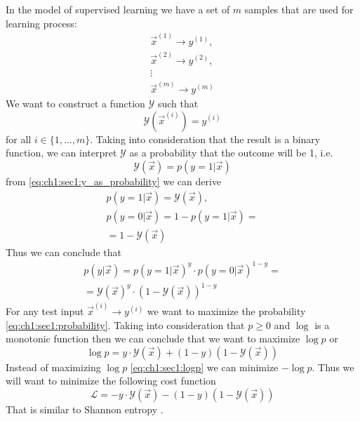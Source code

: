 In the model of supervised learning we have a set of $m$ samples that are used
for learning process:
\[
\begin{array}{c}
  \vec{x}^{(1)} \rightarrow y^{(1)}, \\
  \vec{x}^{(2)} \rightarrow y^{(2)}, \\
  \vdots \\
  \vec{x}^{(m)} \rightarrow y^{(m)}
\end{array}
\]
We want to construct a function $\mathcal{Y}$ such that
\[
\mathcal{Y}\left(\vec{x}^{(i)}\right) = y^{(i)}
\]
for all $i \in \{1, \dots, m\}$. Taking into consideration that the result is a
binary function, we can interpret $\mathcal{Y}$ as a probability that the
outcome will be 1, i.e.
\begin{equation}
  \mathcal{Y}\left(\vec{x}\right) = p\left(\left. y = 1\right|\vec{x}\right)
  \label{eq:ch1:sec1:y_as_probability}
\end{equation}
from \cref{eq:ch1:sec1:y_as_probability} we can derive
\begin{eqnarray}
  p\left(\left. y = 1\right|\vec{x}\right) = \mathcal{Y}\left(\vec{x}\right),
  \nonumber \\
  p\left(\left. y = 0\right|\vec{x}\right) = 1 - p\left(\left. y =
  1\right|\vec{x}\right) =
  \nonumber \\
  = 1 - \mathcal{Y}\left(\vec{x}\right)
  \nonumber
\end{eqnarray}
Thus we can conclude that
\begin{eqnarray}
  p\left(\left. y\right|\vec{x}\right) =
  p\left(\left. y = 1\right|\vec{x}\right)^y \cdot
  p\left(\left. y = 0\right|\vec{x}\right)^{1-y} =
  \nonumber \\
  = \mathcal{Y}\left(\vec{x}\right)^y \cdot
  \left(1 - \mathcal{Y}\left(\vec{x}\right)\right)^{1 - y}
\label{eq:ch1:sec1:probability}
\end{eqnarray}
For any test input $\vec{x}^{(i)} \rightarrow y^{(i)}$ we want to maximize the
probability \cref{eq:ch1:sec1:probability}. Taking into consideration that
$p \ge 0$ and $\log$ is a monotonic function \cite{wiki:monotonic_func} then we
can conclude that we want 
to maximize $\log p$ or
\begin{equation}
\log p = y \cdot \mathcal{Y}\left(\vec{x}\right) +
(1-y) \left(1 - \mathcal{Y}\left(\vec{x}\right)\right)
\label{eq:ch1:sec1:logp}
\end{equation}
Instead of maximizing $\log p$ \cref{eq:ch1:sec1:logp} we can minimize $- \log
p$. Thus we will want to 
minimize the following cost function
\begin{equation}
  \mathcal{L} = - y \cdot \mathcal{Y}\left(\vec{x}\right) -
(1-y) \left(1 - \mathcal{Y}\left(\vec{x}\right)\right)
  \label{eq:ch1:sec1:cost_func}
\end{equation}
That is similar to Shannon entropy \cite{wiki:entropy_information}.

